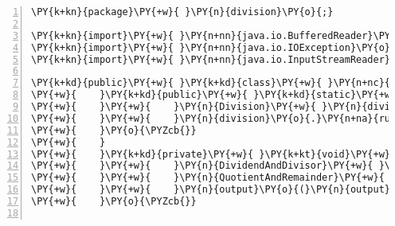 \begin{Verbatim}[commandchars=\\\{\},numbers=left,firstnumber=1,stepnumber=1,frame=single,fontsize=\small]
\PY{k+kn}{package}\PY{+w}{ }\PY{n}{division}\PY{o}{;}

\PY{k+kn}{import}\PY{+w}{ }\PY{n+nn}{java.io.BufferedReader}\PY{o}{;}
\PY{k+kn}{import}\PY{+w}{ }\PY{n+nn}{java.io.IOException}\PY{o}{;}
\PY{k+kn}{import}\PY{+w}{ }\PY{n+nn}{java.io.InputStreamReader}\PY{o}{;}

\PY{k+kd}{public}\PY{+w}{ }\PY{k+kd}{class}\PY{+w}{ }\PY{n+nc}{Division}\PY{+w}{ }\PY{o}{\PYZob{}}
\PY{+w}{    }\PY{k+kd}{public}\PY{+w}{ }\PY{k+kd}{static}\PY{+w}{ }\PY{k+kt}{void}\PY{+w}{ }\PY{n+nf}{main}\PY{o}{(}\PY{n}{String}\PY{o}{[}\PY{o}{]}\PY{+w}{ }\PY{n}{args}\PY{o}{)}\PY{+w}{ }\PY{k+kd}{throws}\PY{+w}{ }\PY{n}{Exception}\PY{+w}{ }\PY{o}{\PYZob{}}
\PY{+w}{    }\PY{+w}{    }\PY{n}{Division}\PY{+w}{ }\PY{n}{division}\PY{+w}{ }\PY{o}{=}\PY{+w}{ }\PY{k}{new}\PY{+w}{ }\PY{n}{Division}\PY{o}{(}\PY{o}{)}\PY{o}{;}
\PY{+w}{    }\PY{+w}{    }\PY{n}{division}\PY{o}{.}\PY{n+na}{run}\PY{o}{(}\PY{o}{)}\PY{o}{;}
\PY{+w}{    }\PY{o}{\PYZcb{}}
\PY{+w}{    }
\PY{+w}{    }\PY{k+kd}{private}\PY{+w}{ }\PY{k+kt}{void}\PY{+w}{ }\PY{n+nf}{run}\PY{o}{(}\PY{o}{)}\PY{+w}{ }\PY{k+kd}{throws}\PY{+w}{ }\PY{n}{Exception}\PY{+w}{ }\PY{o}{\PYZob{}}
\PY{+w}{    }\PY{+w}{    }\PY{n}{DividendAndDivisor}\PY{+w}{ }\PY{n}{input}\PY{+w}{ }\PY{o}{=}\PY{+w}{ }\PY{n}{input}\PY{o}{(}\PY{o}{)}\PY{o}{;}
\PY{+w}{    }\PY{+w}{    }\PY{n}{QuotientAndRemainder}\PY{+w}{ }\PY{n}{output}\PY{+w}{ }\PY{o}{=}\PY{+w}{ }\PY{n}{process}\PY{o}{(}\PY{n}{input}\PY{o}{)}\PY{o}{;}
\PY{+w}{    }\PY{+w}{    }\PY{n}{output}\PY{o}{(}\PY{n}{output}\PY{o}{)}\PY{o}{;}
\PY{+w}{    }\PY{o}{\PYZcb{}}


\end{Verbatim}

